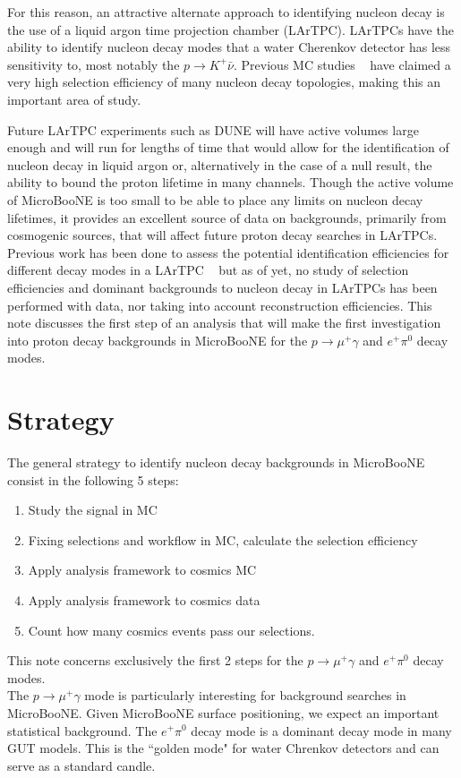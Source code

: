 \documentclass[a4paper, 10pt]{article}
\begin{document}
For this reason, an attractive alternate approach to identifying nucleon decay is the use of a liquid argon time projection chamber (LArTPC). LArTPCs have the ability to identify nucleon decay modes that a water Cherenkov detector has less sensitivity to, most notably the $p\rightarrow K^{+} \bar{\nu}$.  Previous MC studies ~\cite{Bueno:2007um} have claimed a very high selection efficiency of many nucleon decay topologies, making this an important area of study.

Future LArTPC experiments such as DUNE will have active volumes large enough and will run for lengths of time that would allow for the identification of nucleon decay in liquid argon or, alternatively in the case of a null result, the ability to bound the proton lifetime in many channels. Though the active volume of MicroBooNE is too small to be able to place any limits on nucleon decay lifetimes, it provides an excellent source of data on backgrounds, primarily from cosmogenic sources, that will affect future proton decay searches in LArTPCs.
Previous work has been done to assess the potential identification efficiencies for different decay modes in a LArTPC ~\cite{Bueno:2007um} but as of yet, no study of selection efficiencies and dominant backgrounds to nucleon decay in LArTPCs has been performed with data, nor taking into account reconstruction efficiencies. This note discusses the first step of an analysis that will make the first investigation into proton decay backgrounds in MicroBooNE for the $p \rightarrow \mu^{+} \gamma$ and $e^{+} \pi^{0}$  decay modes.


\section{Strategy}
The general strategy to identify nucleon decay backgrounds in MicroBooNE consist in the following 5 steps: 
\begin{enumerate}[topsep=10pt,itemsep=-1ex,partopsep=10pt,parsep=1ex]
\item Study the signal in MC
\item Fixing selections and workflow in MC, calculate the selection efficiency
\item Apply analysis framework to cosmics MC 
\item Apply analysis framework to cosmics data
\item Count how many cosmics events pass our selections.
\end{enumerate}

This note concerns exclusively the first 2 steps for the $p \rightarrow \mu^{+} \gamma$ and $e^{+} \pi^{0}$  decay modes. \\
The   $p \rightarrow \mu^{+} \gamma$  mode is particularly interesting for background searches in MicroBooNE. Given MicroBooNE surface positioning, we expect an important statistical background. The  $e^{+} \pi^{0}$ decay mode is a dominant decay mode in many GUT models. This is the ``golden mode" for water Chrenkov detectors and can serve as a standard candle.
\end{document}

